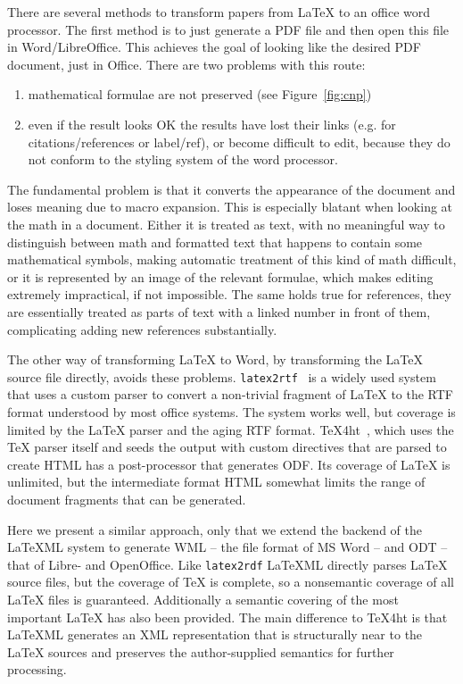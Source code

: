 \documentclass{llncs}
\def\latexml{{\LaTeX}ML\xspace}
\begin{document}
There are several methods to transform papers from {\LaTeX} to an office word
processor. The first method is to just generate a PDF file and then open this file in
Word/LibreOffice. This achieves the goal of looking like the desired PDF document, just in
Office. There are two problems with this route: 
\begin{enumerate}
\item mathematical formulae are not preserved (see Figure~\ref{fig:cnp})
\item even if the result looks OK the results have lost their links (e.g. for
  citations/references or label/ref), or become difficult to edit, because they do not
  conform to the styling system of the word processor.
\end{enumerate}
The fundamental problem is that it converts the appearance of the document and loses
meaning due to macro expansion. This is especially blatant when looking at the math in a
document. Either it is treated as text, with no meaningful way to distinguish between math
and formatted text that happens to contain some mathematical symbols, making automatic
treatment of this kind of math difficult, or it is represented by an image of the relevant
formulae, which makes editing extremely impractical, if not impossible. The same holds true
for references, they are essentially treated as parts of text with a linked number in
front of them, complicating adding new references substantially.

The other way of transforming {\LaTeX} to Word, by transforming the {\LaTeX} source file
directly, avoids these problems. \texttt{latex2rtf}~\cite{latex2rtf:on} is a widely used
system that uses a custom parser to convert a non-trivial fragment of {\LaTeX} to the RTF
format understood by most office systems. The system works well, but coverage is limited
by the {\LaTeX} parser and the aging RTF format.  TeX4ht~\cite{tex4ht:online}, which uses
the {\TeX} parser itself and seeds the output with custom directives that are parsed to
create HTML has a post-processor that generates ODF. Its coverage of {\LaTeX} is unlimited,
but the intermediate format HTML somewhat limits the range of document fragments that can
be generated. 

Here we present a similar approach, only that we extend the backend of the \latexml system
to generate WML -- the file format of MS Word -- and ODT -- that of Libre- and
OpenOffice. Like \texttt{latex2rdf} \latexml directly parses {\LaTeX} source files, but
the coverage of {\TeX} is complete, so a nonsemantic coverage of all {\LaTeX} files is guaranteed. Additionally a semantic covering of the most important {\LaTeX} has also been provided.  The main difference to
TeX4ht is that \latexml generates an XML representation that is structurally near to the
{\LaTeX} sources and preserves the author-supplied semantics for further processing.
\end{document}
